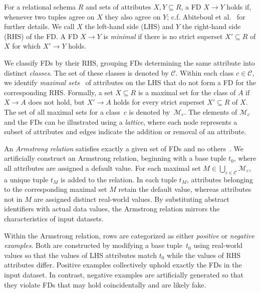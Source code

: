 For a relational schema $R$ and sets of attributes $X, Y\subseteq R$, a FD $X \rightarrow Y$ holds if, whenever two tuples agree on $X$ they also agree on $Y$; c.f. Abiteboul et al.~\citep{DBLP:books/aw/AbiteboulHV95} for further details. We call $X$ the left-hand side (LHS) and $Y$ the right-hand side (RHS) of the FD. A FD $X \rightarrow Y$ is \emph{minimal} if there is no strict superset $X' \subseteq R$ of $X$ for which $X' \rightarrow Y$ holds.%

We classify FDs by their RHS, grouping FDs determining the same attribute into distinct \emph{classes}. The set of these classes is denoted by $\mathcal{C}$. Within each class $c \in \mathcal{C}$, we identify \emph{maximal sets}~\citep{DBLP:conf/edbt/LopesPL00} of attributes on the LHS that do not form a FD for the corresponding RHS. 
Formally, a set $X \subseteq R$ is a maximal set for the class of $A$ if $X \rightarrow A$ does not hold, but $X' \rightarrow A$ holds for every strict superset $X' \subseteq R$ of $X$. 
The set of all maximal sets for a class~$c$ is denoted by~$\mathcal{M}_c$. The elements of $\mathcal{M}_c$ and the FDs can be illustrated using a \emph{lattice}, where each node represents a subset of attributes and edges indicate the addition or removal of an attribute. 

An \emph{Armstrong relation} satisfies exactly a given set of FDs and no 
others~\citep{DBLP:books/aw/AbiteboulHV95}. We artificially construct an Armstrong relation, beginning with a base tuple $t_0$, where all attributes are assigned a default value. For each maximal set $M \in \bigcup_{c \in \mathcal{C}}\mathcal{M}_c$, a unique tuple $t_{M}$ is added to the relation. In each tuple $t_{M}$, attributes belonging to the corresponding maximal set $M$ retain the default value, whereas attributes not in $M$ are assigned distinct real-world values. By substituting abstract identifiers with actual data values, the Armstrong relation mirrors the characteristics of input datasets.

Within the Armstrong relation, rows are categorized as either \emph{positive} or \emph{negative examples}. Both are constructed by modifying a base 
tuple~$t_0$ using real-world values so that the values of LHS attributes match $t_0$ while the values of RHS attributes differ. Positive examples collectively uphold exactly the FDs in the input dataset. In contrast, negative examples are artificially generated so that they violate FDs that may hold coincidentally and are likely fake.

